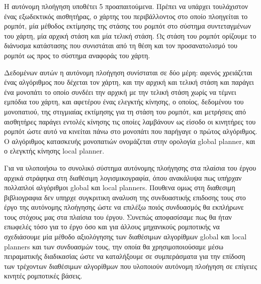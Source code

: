 \documentclass[a4paper,10pt]{article}
\begin{document}
Η αυτόνομη πλοήγηση υποθέτει 5 προαπαιτούμενα. Πρέπει να υπάρχει τουλάχιστον
ένας εξωδεκτικός αισθητήρας, ο χάρτης του περιβάλλοντος στο οποίο πλοηγείται το
ρομπότ, μία μέθοδος εκτίμησης της στάσης του ρομπότ στο σύστημα συντεταγμένων
του χάρτη, μία αρχική στάση και μία τελική στάση. Ως στάση του ρομπότ ορίζουμε
το διάνυσμα κατάστασης που συνιστάται από τη θέση και τον προσανατολισμό του
ρομπότ ως προς το σύστημα αναφοράς του χάρτη.

Δεδομένων αυτών η αυτόνομη πλοήγηση συνίσταται σε δύο μέρη: αφενός χρειάζεται
ένας αλγόριθμος που δέχεται τον χάρτη, και την αρχική και τελική στάση και
παράγει ένα μονοπάτι το οποίο συνδέει την αρχική με την τελική στάση χωρίς να
τέμνει εμπόδια του χάρτη, και αφετέρου ένας ελεγκτής κίνησης, ο οποίος,
δεδομένου του μονοπατιού, της στιγμιαίας εκτίμησης για τη στάση του ρομπότ, και
μετρήσεις από αισθητήρες παράγει εντολές κίνησης τις οποίες λαμβάνουν ως είσοδο
οι κινητήρες του ρομπότ ώστε αυτό να κινείται πάνω στο μονοπάτι που παρήγαγε ο
πρώτος αλγόριθμος. Ο αλγόριθμος κατασκευής μονοπατιών ονομάζεται στην ορολογία
global planner, και ο ελεγκτής κίνησης local planner.

Για να υλοποιήσω το συνολικό σύστημα αυτόνομης πλοήγησης στα πλαίσια του έργου
αρχικά στράφηκα στη διαθέσιμη λογισμικογραφία, όπου ανακάλυψα πως υπήρχαν
πολλαπλοί αλγόριθμοι global και local planners. Πουθενα ομως στη διαθεσιμη
βιβλιογραφια δεν υπηρχε συγκριτικη αναλυση της συνδυαστικής επιδοσης τους στο
έργο της αυτόνομης πλοήγησης ώστε να επιλέξω ποιός συνδυασμός θα εκπλήρωνε τους
στόχους μας στα πλαίσια του έργου. Συνεπώς αποφασίσαμε πως θα ήταν επωφελές
τόσο για το έργο όσο και για άλλους μηχανικούς ρομποτικής να σχεδιάσουμε μία
μέθοδο αξιολόγησης των διαθέσιμων αλγορίθμων global και local planners και των
συνδυασμών τους, την οποία θα χρησιμοποιούσαμε μέσω πειραματικής διαδικασίας
ώστε να καταλήξουμε σε συμπεράσματα για την επίδοση των τρέχοντων διαθέσιμων
αλγορίθμων που υλοποιούν αυτόνομη πλοήγηση σε επίγειες κινητές ρομποτικές
βάσεις.
\end{document}
